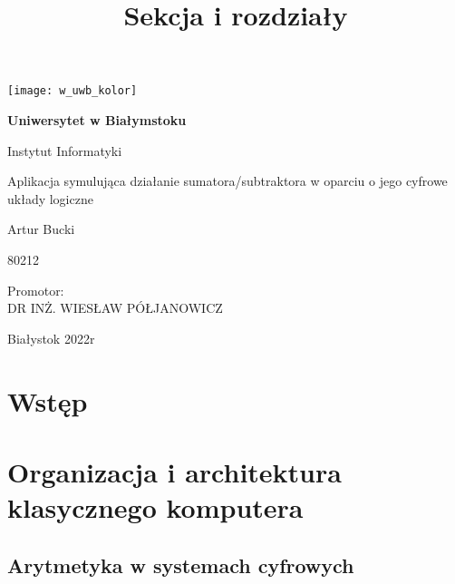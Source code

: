 \documentclass[12pt, a4paper, onside, polish]{article}				%
\title{Sekcja i rozdziały}						%
\begin{document}
\begin{titlepage}
	\begin{center}
	
		\texttt{[image: w\_uwb\_kolor]}
		
		\vspace{2cm}

	
		\Huge
        		\textbf{Uniwersytet w Białymstoku}
        		
        		\vspace{0.5cm}
        		\LARGE
        		Instytut Informatyki
        		
        		\vspace{1cm}
        		\LARGE
        		Aplikacja symulująca działanie sumatora/subtraktora w oparciu o jego cyfrowe układy logiczne 
        		
        		\vspace{1.5cm}
        		\large
        		Artur Bucki
        		
        		\large
        		80212
        		
        		\vspace{0.5cm}
        		
		\begin{flushright}
		Promotor:\\
		DR INŻ. WIESŁAW PÓŁJANOWICZ\\
		\end{flushright}


		\vspace*{\fill}
		\large
		Białystok 2022r
        		
	\end{center}
\end{titlepage}





\tableofcontents
\cleardoublepage


\section{Wstęp}
\cleardoublepage



\section{Organizacja i architektura klasycznego komputera}

\subsection{Arytmetyka w systemach cyfrowych}
\end{document}
